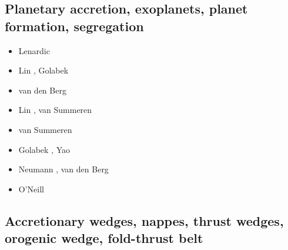 \begin{scriptsize}
\cite{begl94b}
\cite{belg95a}
\cite{belg95b}
\cite{bekf96}\cite{como96}
\cite{bekk97}
\cite{pobe98}\cite{zhat98}
\cite{hans03}\cite{katf04}
\cite{huvv04}
\cite{yiha10}\cite{libe10}
\end{scriptsize}

\subsection{Planetary accretion, exoplanets, planet formation, segregation}

\begin{scriptsize}
\begin{itemize}
\item[\twothousandeight] Lenardic \etal \cite{lejm08} 
\item[\twothousandnine] Lin \etal \cite{ligt09}, Golabek \etal \cite{gogk09}
\item[\twothousandten] van den Berg \etal \cite{vayb10}
\item[\twothousandeleven] Lin \etal \cite{ligt11}, van Summeren \etal \cite{vacg11}
\item[\twothousandthirteen] van Summeren \etal \cite{vagc13}
\item[\twothousandfourteen] Golabek \etal \cite{gobg14}, Yao \etal \cite{yadl14}
\item[\twothousandnineteen] Neumann \cite{neum19}, van den Berg \etal \cite{vayu19}
\item[\twothousandtwenty] O'Neill \etal \cite{onlw20}
\end{itemize}
\end{scriptsize}

\subsection{Accretionary wedges, nappes, thrust wedges, orogenic wedge, fold-thrust belt} 

